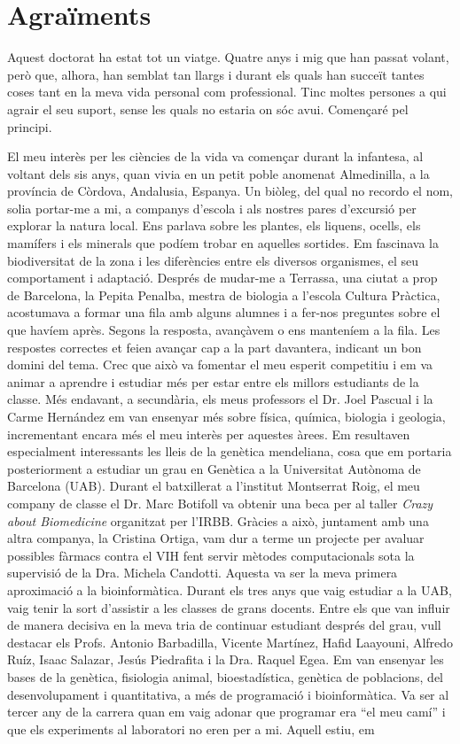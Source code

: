 \chapter*{Agraïments} %

Aquest doctorat ha estat tot un viatge. Quatre anys i mig que han passat volant, però que, alhora, han semblat tan llargs i durant els quals han succeït tantes coses tant en la meva vida personal com professional. Tinc moltes persones a qui agrair el seu suport, sense les quals no estaria on sóc avui. Començaré pel principi.

El meu interès per les ciències de la vida va començar durant la infantesa, al voltant dels sis anys, quan vivia en un petit poble anomenat Almedinilla, a la província de Còrdova, Andalusia, Espanya. Un biòleg, del qual no recordo el nom, solia portar-me a mi, a companys d'escola i als nostres pares d'excursió per explorar la natura local. Ens parlava sobre les plantes, els liquens, ocells, els mamífers i els minerals que podíem trobar en aquelles sortides. Em fascinava la biodiversitat de la zona i les diferències entre els diversos organismes, el seu comportament i adaptació. Després de mudar-me a Terrassa, una ciutat a prop de Barcelona, la Pepita Penalba, mestra de biologia a l'escola Cultura Pràctica, acostumava a formar una fila amb alguns alumnes i a fer-nos preguntes sobre el que havíem après. Segons la resposta, avançàvem o ens manteníem a la fila. Les respostes correctes et feien avançar cap a la part davantera, indicant un bon domini del tema. Crec que això va fomentar el meu esperit competitiu i em va animar a aprendre i estudiar més per estar entre els millors estudiants de la classe. Més endavant, a secundària, els meus professors el Dr. Joel Pascual i la Carme Hernández em van ensenyar més sobre física, química, biologia i geologia, incrementant encara més el meu interès per aquestes àrees. Em resultaven especialment interessants les lleis de la genètica mendeliana, cosa que em portaria posteriorment a estudiar un grau en Genètica a la Universitat Autònoma de Barcelona (UAB). Durant el batxillerat a l'institut Montserrat Roig, el meu company de classe el Dr. Marc Botifoll va obtenir una beca per al taller \textit{Crazy about Biomedicine} organitzat per l'IRBB. Gràcies a això, juntament amb una altra companya, la Cristina Ortiga, vam dur a terme un projecte per avaluar possibles fàrmacs contra el VIH fent servir mètodes computacionals sota la supervisió de la Dra. Michela Candotti. Aquesta va ser la meva primera aproximació a la bioinformàtica. Durant els tres anys que vaig estudiar a la UAB, vaig tenir la sort d'assistir a les classes de grans docents. Entre els que van influir de manera decisiva en la meva tria de continuar estudiant després del grau, vull destacar els Profs. Antonio Barbadilla, Vicente Martínez, Hafid Laayouni, Alfredo Ruíz, Isaac Salazar, Jesús Piedrafita i la Dra. Raquel Egea. Em van ensenyar les bases de la genètica, fisiologia animal, bioestadística, genètica de poblacions, del desenvolupament i quantitativa, a més de programació i bioinformàtica. Va ser al tercer any de la carrera quan em vaig adonar que programar era ``el meu camí'' i que els experiments al laboratori no eren per a mi. Aquell estiu, em 